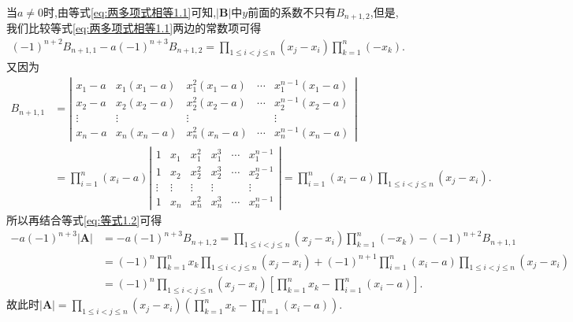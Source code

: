 \documentclass[../../main.tex]{subfiles}%
\begin{document}
\begin{solution}
当\(a\neq 0\)时,由等式\eqref{eq:两多项式相等1.1}可知,\(|\boldsymbol{B}|\)中\(y\)前面的系数不只有\(B_{n + 1,2}\),但是,我们比较等式\eqref{eq:两多项式相等1.1}两边的常数项可得
\begin{align}\label{eq:等式1.2}
(-1)^{n + 2}B_{n + 1,1}-a(-1)^{n + 3}B_{n + 1,2}=\prod_{1\leqslant i < j\leqslant n}(x_j - x_i)\prod_{k = 1}^{n}(-x_k).
\end{align}
又因为
\begin{align*}
B_{n + 1,1}&=\left|\begin{matrix}
x_1 - a & x_1(x_1 - a) & x_{1}^{2}(x_1 - a) & \cdots & x_{1}^{n - 1}(x_1 - a)\\
x_2 - a & x_2(x_2 - a) & x_{2}^{2}(x_2 - a) & \cdots & x_{2}^{n - 1}(x_2 - a)\\
\vdots & \vdots & \vdots &  & \vdots\\
x_n - a & x_n(x_n - a) & x_{n}^{2}(x_n - a) & \cdots & x_{n}^{n - 1}(x_n - a)
\end{matrix}\right|
\\
&=\prod_{i = 1}^{n}(x_i - a)\left|\begin{matrix}
1 & x_1 & x_{1}^{2} & x_{1}^{3} & \cdots & x_{1}^{n - 1}\\
1 & x_2 & x_{2}^{2} & x_{2}^{3} & \cdots & x_{2}^{n - 1}\\
\vdots & \vdots & \vdots & \vdots &  & \vdots\\
1 & x_n & x_{n}^{2} & x_{n}^{3} & \cdots & x_{n}^{n - 1}
\end{matrix}\right|=\prod_{i = 1}^{n}(x_i - a)\prod_{1\leqslant i < j\leqslant n}(x_j - x_i).
\end{align*}
所以再结合等式\eqref{eq:等式1.2}可得
\begin{align*}
-a(-1)^{n + 3}|\boldsymbol{A}|&=-a(-1)^{n + 3}B_{n + 1,2}=\prod_{1\leqslant i < j\leqslant n}(x_j - x_i)\prod_{k = 1}^{n}(-x_k)-(-1)^{n + 2}B_{n + 1,1}
\\
&=(-1)^n\prod_{k = 1}^{n}x_k\prod_{1\leqslant i < j\leqslant n}(x_j - x_i)+(-1)^{n + 1}\prod_{i = 1}^{n}(x_i - a)\prod_{1\leqslant i < j\leqslant n}(x_j - x_i)
\\
&=(-1)^n\prod_{1\leqslant i < j\leqslant n}(x_j - x_i)\left[\prod_{k = 1}^{n}x_k-\prod_{i = 1}^{n}(x_i - a)\right].
\end{align*}
故此时\(|\boldsymbol{A}|=\prod_{1\leqslant i < j\leqslant n}(x_j - x_i)\left(\prod_{k = 1}^{n}x_k-\prod_{i = 1}^{n}(x_i - a)\right)\).

\end{solution}
\end{document}
